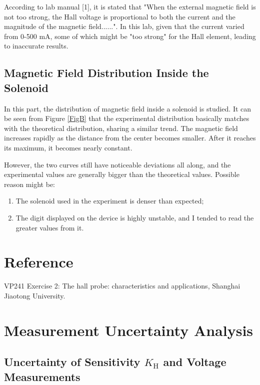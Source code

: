 \documentclass{article}
\begin{document}
According to lab manual [1], it is stated that "When the external magnetic field is not too strong, the Hall voltage is proportional to both the current and the magnitude of the magnetic field......". In this lab, given that the current varied from 0-500 mA, some of which might be "too strong" for the Hall element, leading to inaccurate results.
	
	
	
	\subsection{Magnetic Field Distribution Inside the Solenoid}
	
In this part, the distribution of magnetic field inside a solenoid is studied. It can be seen from Figure \ref{FigB} 
that the experimental distribution basically matches with the theoretical distribution, sharing a similar trend. The magnetic field increases rapidly as the distance from the center becomes smaller. After it reaches its maximum, it becomes nearly constant.

However, the two curves still have noticeable deviations all along, and the experimental values are generally bigger than the theoretical values. Possible reason might be:

\begin{enumerate}
\item  The solenoid used in the experiment is denser than expected;
\item The digit displayed on the device is highly unstable, and I tended to read the greater values from it.
\end{enumerate}

		\section{Reference}

\noindent [1] VP241 Exercise 2: The hall probe: characteristics and applications, Shanghai Jiaotong University.

\newpage



\appendix



		\section{Measurement Uncertainty Analysis}

	\subsection{Uncertainty of Sensitivity $K_\text{H}$ and Voltage Measurements}
\end{document}
